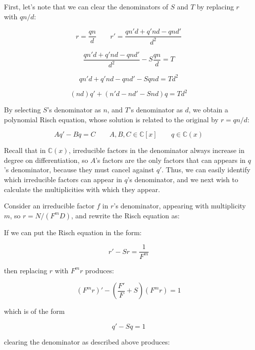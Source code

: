 First, let's note that we can clear the denominators of $S$ and $T$ by
replacing $r$ with $qn/d$:

$$r = \frac{qn}{d} \qquad r' = \frac{q n' d + q' n d - q n d'}{d^2}$$

$$\frac{q n' d + q' n d - q n d'}{d^2} - S \frac{qn}{d} = T$$

$$q n' d + q' n d - q n d' - S q n d = T d^2$$

$$(n d) q' + (n' d - n d' - S n d) q = T d^2$$

By selecting $S$'s denominator as $n$, and $T$'s denominator as $d$,
we obtain a polynomial Risch equation, whose solution is related
to the original by $r=qn/d$:

$$A q' - B q = C \qquad A,B,C \in {\mathbb C}[x] \qquad q \in {\mathbb C}(x)$$


Recall that in ${\mathbb C}(x)$, irreducible factors in the
denominator always increase in degree on differentiation, so $A$'s
factors are the only factors that can appears in $q$'s denominator,
because they must cancel against $q'$.  Thus, we can easily identify
which irreducible factors can appear in $q$'s denominator, and we next
wish to calculate the multiplicities with which they appear.

Consider an irreducible factor $f$ in $r$'s denominator, appearing with
multiplicity $m$, so $r = N/(F^m D)$, and rewrite the Risch equation as:

\begin{comment}
$$A f^a \frac{n' f d - n(m d + f d')}{f^{m+1} d^2} - B f^b \frac{n}{f^m d} = C f^c$$

$$A f^a (n' f d - n(m d + f d')) - B f^{b+1} n d = C d^2 f^{c+m+1} $$

$$A f^a (n' f d - m n d - f n d') - B f^{b+1} n d = C d^2 f^{c+m+1} $$

$$A n' d f^{a+1} - m A n d f^a - A n d' f^{a+1} - B n d f^{b+1} = C d^2 f^{c+m+1} $$
\end{comment}

\vfill\eject

If we can put the Risch equation in the form:

$$r' - S r = \frac{1}{F^m}$$

then replacing $r$ with $F^m r$ produces:

$$(F^m r)' - (\frac{F'}{F} + S) (F^m r) = 1$$

which is of the form

$$q' - S q = 1$$

clearing the denominator as described above produces:

